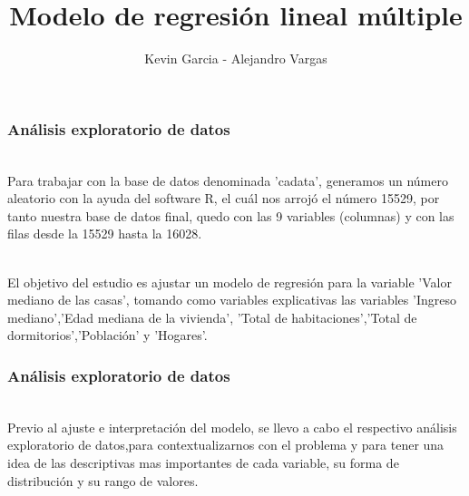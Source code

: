 \documentclass[12pt]{beamer}
\author{Kevin Garcia - Alejandro Vargas}
\title{Modelo de regresión lineal múltiple}
\begin{document}
\begin{frame}
\titlepage
\end{frame}

\begin{frame}
\frametitle{Análisis exploratorio de datos}
~\\ Para trabajar con la base de datos denominada 'cadata', generamos un número aleatorio con la ayuda del software R, el cuál nos arrojó el número 15529, por tanto nuestra base de datos final, quedo con las 9 variables (columnas) y con las filas desde la 15529 hasta la 16028.

~\\ El objetivo del estudio es ajustar un modelo de regresión para la variable 'Valor mediano de las casas', tomando como variables explicativas las variables 'Ingreso mediano','Edad mediana de la vivienda', 'Total de habitaciones','Total de dormitorios','Población' y 'Hogares'. 
\end{frame}

\begin{frame}
\frametitle{Análisis exploratorio de datos}
~\\ Previo al ajuste e interpretación del modelo, se llevo a cabo el respectivo análisis exploratorio de datos,para contextualizarnos con el problema y para tener una idea de las descriptivas mas importantes de cada variable, su forma de distribución y su rango de valores.
\end{frame}
\end{document}
